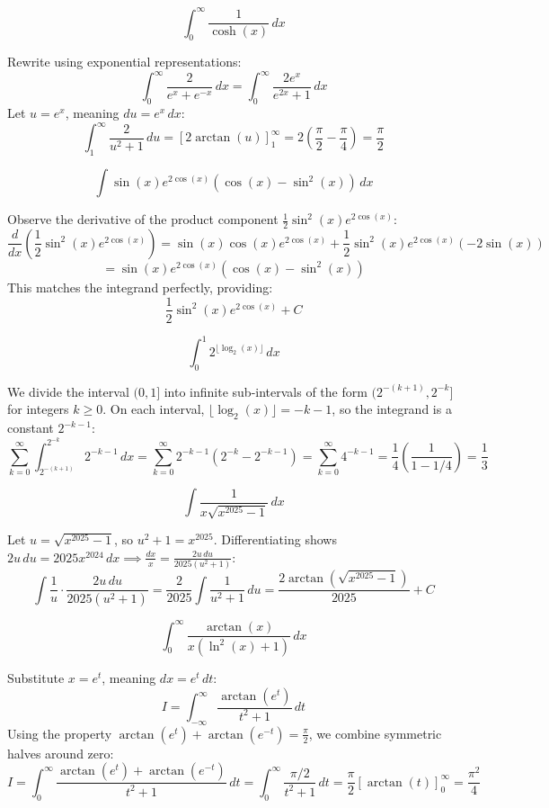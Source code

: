 \begin{questions}
\question
\[ \int_{0}^{\infty} \frac{1}{\cosh(x)} \, dx \]
\begin{solution}
Rewrite using exponential representations:
\[ \int_{0}^{\infty} \frac{2}{e^x+e^{-x}} \, dx = \int_{0}^{\infty} \frac{2e^x}{e^{2x}+1} \, dx \]
Let $u = e^x$, meaning $du = e^x \, dx$:
\[ \int_{1}^{\infty} \frac{2}{u^2+1} \, du = \left[ 2\arctan(u) \right]_{1}^{\infty} = 2\left(\frac{\pi}{2} - \frac{\pi}{4}\right) = \frac{\pi}{2} \]
\end{solution}

\question
\[ \int \sin(x)e^{2\cos(x)}(\cos(x)-\sin^{2}(x)) \, dx \]
\begin{solution}
Observe the derivative of the product component $\frac{1}{2}\sin^2(x)e^{2\cos(x)}$:
\[ \frac{d}{dx}\left(\frac{1}{2}\sin^2(x)e^{2\cos(x)}\right) = \sin(x)\cos(x)e^{2\cos(x)} + \frac{1}{2}\sin^2(x)e^{2\cos(x)}(-2\sin(x)) \]
\[ = \sin(x)e^{2\cos(x)}(\cos(x)-\sin^2(x)) \]
This matches the integrand perfectly, providing:
\[ \frac{1}{2}\sin^{2}(x)e^{2\cos(x)} + C \]
\end{solution}

\question
\[ \int_{0}^{1} 2^{\lfloor\log_{2}(x)\rfloor} \, dx \]
\begin{solution}
We divide the interval $(0, 1]$ into infinite sub-intervals of the form $(2^{-(k+1)}, 2^{-k}]$ for integers $k \ge 0$. On each interval, $\lfloor\log_2(x)\rfloor = -k-1$, so the integrand is a constant $2^{-k-1}$:
\[ \sum_{k=0}^{\infty} \int_{2^{-(k+1)}}^{2^{-k}} 2^{-k-1} \, dx = \sum_{k=0}^{\infty} 2^{-k-1} \left(2^{-k} - 2^{-k-1}\right) = \sum_{k=0}^{\infty} 4^{-k-1} = \frac{1}{4}\left(\frac{1}{1-1/4}\right) = \frac{1}{3} \]
\end{solution}

\question
\[ \int \frac{1}{x\sqrt{x^{2025}-1}} \, dx \]
\begin{solution}
Let $u = \sqrt{x^{2025}-1}$, so $u^2+1 = x^{2025}$. Differentiating shows $2u \, du = 2025x^{2024} \, dx \implies \frac{dx}{x} = \frac{2u \, du}{2025(u^2+1)}$:
\[ \int \frac{1}{u} \cdot \frac{2u \, du}{2025(u^2+1)} = \frac{2}{2025}\int \frac{1}{u^2+1} \, du = \frac{2\arctan\left(\sqrt{x^{2025}-1}\right)}{2025} + C \]
\end{solution}

\question [Bonus]
\[ \int_{0}^{\infty} \frac{\arctan(x)}{x(\ln^{2}(x)+1)} \, dx \]
\begin{solution}
Substitute $x = e^t$, meaning $dx = e^t \, dt$:
\[ I = \int_{-\infty}^{\infty} \frac{\arctan(e^t)}{t^2+1} \, dt \]
Using the property $\arctan(e^t) + \arctan(e^{-t}) = \frac{\pi}{2}$, we combine symmetric halves around zero:
\[ I = \int_{0}^{\infty} \frac{\arctan(e^t)+\arctan(e^{-t})}{t^2+1} \, dt = \int_{0}^{\infty} \frac{\pi/2}{t^2+1} \, dt = \frac{\pi}{2}\left[\arctan(t)\right]_0^\infty = \frac{\pi^2}{4} \]
\end{solution}

\end{questions}

